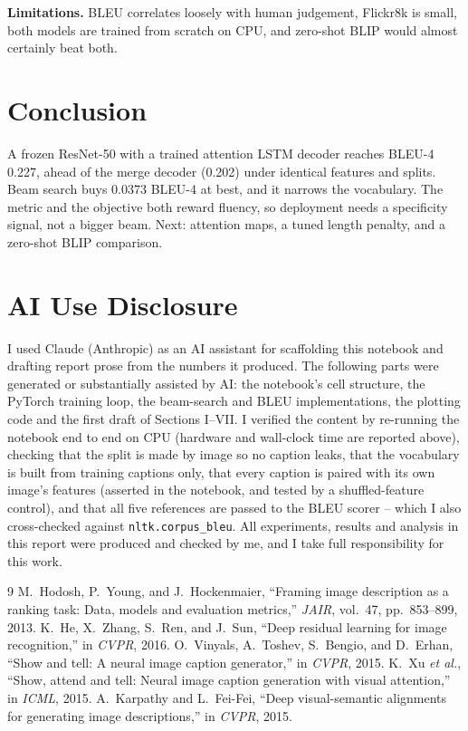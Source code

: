 \documentclass[10pt,conference]{IEEEtran}
\begin{document}
\textbf{Limitations.} BLEU correlates loosely with human judgement, Flickr8k is small, both
models are trained from scratch on CPU, and zero-shot BLIP would almost certainly beat both.

\section{Conclusion}
A frozen ResNet-50 with a trained attention LSTM decoder reaches BLEU-4 0.227, ahead of the merge decoder (0.202) under identical features and splits. Beam search buys 0.0373 BLEU-4 at best, and it narrows the vocabulary. The metric and the objective both reward fluency, so deployment needs a specificity signal, not a bigger beam. Next: attention maps, a tuned length penalty, and a zero-shot BLIP comparison.

\newpage
\section*{AI Use Disclosure}
I used Claude (Anthropic) as an AI assistant for scaffolding this notebook and drafting report
prose from the numbers it produced. The following parts were generated or substantially assisted by
AI: the notebook's cell structure, the PyTorch training loop, the beam-search and BLEU
implementations, the plotting code and the first draft of Sections I--VII. I verified the content by
re-running the notebook end to end on CPU (hardware and wall-clock time are reported above),
checking that the split is made by image so no caption leaks, that the vocabulary is built from
training captions only, that every caption is paired with its own image's features (asserted in the
notebook, and tested by a shuffled-feature control), and that all five references are passed to the
BLEU scorer -- which I also cross-checked against \texttt{nltk.corpus\_bleu}. All experiments,
results and analysis in this report were produced and checked by me, and I take full responsibility
for this work.

\begin{thebibliography}{9}
 M.~Hodosh, P.~Young, and J.~Hockenmaier, ``Framing image description as a
ranking task: Data, models and evaluation metrics,'' \emph{JAIR}, vol.~47, pp.~853--899, 2013.
 K.~He, X.~Zhang, S.~Ren, and J.~Sun, ``Deep residual learning for image
recognition,'' in \emph{CVPR}, 2016.
 O.~Vinyals, A.~Toshev, S.~Bengio, and D.~Erhan, ``Show and tell: A neural image
caption generator,'' in \emph{CVPR}, 2015.
 K.~Xu \emph{et al.}, ``Show, attend and tell: Neural image caption generation with
visual attention,'' in \emph{ICML}, 2015.
 A.~Karpathy and L.~Fei-Fei, ``Deep visual-semantic alignments for generating
image descriptions,'' in \emph{CVPR}, 2015.
\end{thebibliography}
\end{document}
